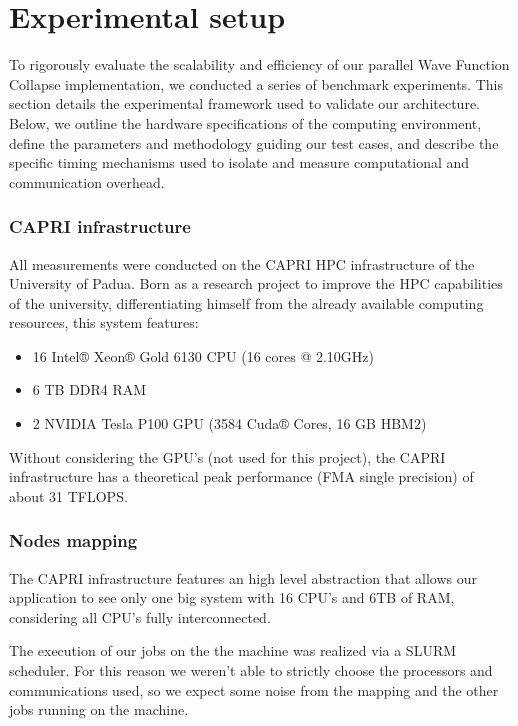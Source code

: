 \section{Experimental setup}

To rigorously evaluate the scalability and efficiency of our parallel Wave Function Collapse implementation, we conducted a series of benchmark experiments. This section details the experimental framework used to validate our architecture. Below, we outline the hardware specifications of the computing environment, define the parameters and methodology guiding our test cases, and describe the specific timing mechanisms used to isolate and measure computational and communication overhead.

\subsubsection{CAPRI infrastructure}
All measurements were conducted on the CAPRI HPC infrastructure of the University of Padua.
Born as a research project to improve the HPC capabilities of the university, differentiating himself from the already available computing resources, this system features:
\begin{itemize}
    \item 16 Intel® Xeon® Gold 6130 CPU (16 cores @ 2.10GHz)
    \item 6 TB DDR4 RAM 
    \item 2 NVIDIA Tesla P100 GPU (3584 Cuda® Cores, 16 GB HBM2)
\end{itemize}

Without considering the GPU's (not used for this project), the CAPRI infrastructure has a theoretical peak performance (FMA single precision) of about 31 TFLOPS.

\subsubsection{Nodes mapping}
The CAPRI infrastructure features an high level abstraction that allows our application to see only one big system with 16 CPU's and 6TB of RAM, considering all CPU's fully interconnected.

The execution of our jobs on the the machine was realized via a SLURM scheduler. For this reason we weren't able to strictly choose the processors and communications used, so we expect some noise from the mapping and the other jobs running on the machine.

